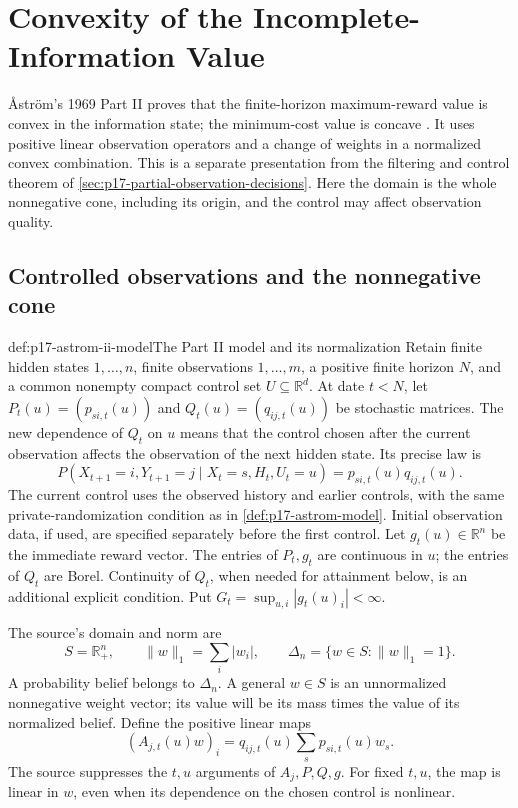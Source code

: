 \chapter{Convexity of the Incomplete-Information Value}
\label{sec:p17-astrom-incomplete-information-ii}

\AA str\"om's 1969 Part II proves that the finite-horizon
maximum-reward value is convex in the information state;
the minimum-cost value is concave
\cite[pp.~403--406]{Astrom1969IncompleteInformationII}.
It uses positive linear observation operators and a change
of weights in a normalized convex combination.
This is a separate presentation from the filtering and
control theorem of \cref{sec:p17-partial-observation-decisions}.
Here the domain is the whole nonnegative cone, including
its origin, and the control may affect observation quality.

\section{Controlled observations and the nonnegative cone}

\begin{hbdefinition}{def:p17-astrom-ii-model}{The Part II model and its normalization}
Retain finite hidden states \(1,\ldots,n\), finite observations
\(1,\ldots,m\), a positive finite horizon \(N\), and a common
nonempty compact control set \(U\subseteq\mathbb R^d\).
At date \(t<N\), let \(P_t(u)=(p_{si,t}(u))\) and
\(Q_t(u)=(q_{ij,t}(u))\) be stochastic matrices.
The new dependence of \(Q_t\) on \(u\) means that the control
chosen after the current observation affects the observation
of the next hidden state. Its precise law is
\[
 P(X_{t+1}=i,Y_{t+1}=j\mid X_t=s,H_t,U_t=u)
                      =p_{si,t}(u)q_{ij,t}(u).
\]
The current control uses the observed history and earlier
controls, with the same private-randomization condition as
in \cref{def:p17-astrom-model}. Initial observation data,
if used, are specified separately before the first control.
Let \(g_t(u)\in\mathbb R^n\) be the immediate reward vector.
The entries of \(P_t,g_t\) are continuous in \(u\);
the entries of \(Q_t\) are Borel.
Continuity of \(Q_t\), when needed for attainment below,
is an additional explicit condition.
Put \(G_t=\sup_{u,i}|g_t(u)_i|<\infty\).

The source's domain and norm are
\[
 S=\mathbb R_+^n,\qquad \|w\|_1=\sum_i|w_i|,\qquad
 \Delta_n=\{w\in S:\|w\|_1=1\}.
\]
A probability belief belongs to \(\Delta_n\).
A general \(w\in S\) is an unnormalized nonnegative weight
vector; its value will be its mass times the value of its
normalized belief. Define the positive linear maps
\[
                (A_{j,t}(u)w)_i
                      =q_{ij,t}(u)\sum_s p_{si,t}(u)w_s .
\]
The source suppresses the \(t,u\) arguments of \(A_j,P,Q,g\).
For fixed \(t,u\), the map is linear in \(w\), even when
its dependence on the chosen control is nonlinear.
\end{hbdefinition}

